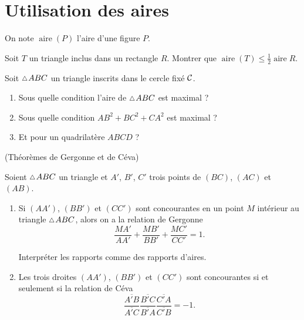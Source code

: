 \documentclass[a4paper,11pt,reqno]{amsart}
\DeclareMathOperator{\aire}{aire}
\begin{document}
\section{Utilisation des aires}

\begin{convention}
  On note $\aire (P)$ l'aire d'une figure $P$.
\end{convention}

\begin{exo}

  Soit $T$ un triangle inclus dans un rectangle $R$. Montrer que $\aire(T) \leqslant \frac{1}{2}\aire{R}$.
\end{exo}

\begin{exo}
  Soit $\tri ABC$ un triangle inscrits dans le cercle fixé $\mathcal{C}$.
  \begin{enumerate}
    \item Sous quelle condition l'aire de $\tri ABC$ est maximal ?
    \item Sous quelle condition $AB^{2}+BC^{2}+CA^{2}$ est maximal ?
    \item Et pour un quadrilatère $ABCD$ ?
  \end{enumerate}

\end{exo}

\begin{exo} (Théorèmes de Gergonne et de Céva)

  Soient $\tri ABC$ un triangle et $A'$, $B'$, $C'$ trois points de $(BC)$, $(AC)$ et $(AB)$.
  \begin{enumerate}
    \item Si $(AA')$, $(BB')$ et $(CC')$ sont concourantes en un point $M$ intérieur au triangle $\tri ABC$, alors on a la relation de Gergonne
    $$
      \frac{MA'}{AA'}+\frac{MB'}{BB'}+\frac{MC'}{CC'}=1.
    $$
    \begin{indication}
      Interpréter les rapports comme des rapports d'aires.
    \end{indication}
    \item Les trois droites $(AA')$, $(BB')$ et $(CC')$ sont concourantes si et seulement si la relation de Céva
      $$
        \frac{\overline{A'B}}{\overline{A'C}}\frac{\overline{B'C}}{\overline{B'A}}\frac{\overline{C'A}}{\overline{C'B}}=-1.
      $$
  \end{enumerate}
\end{exo}
\end{document}
